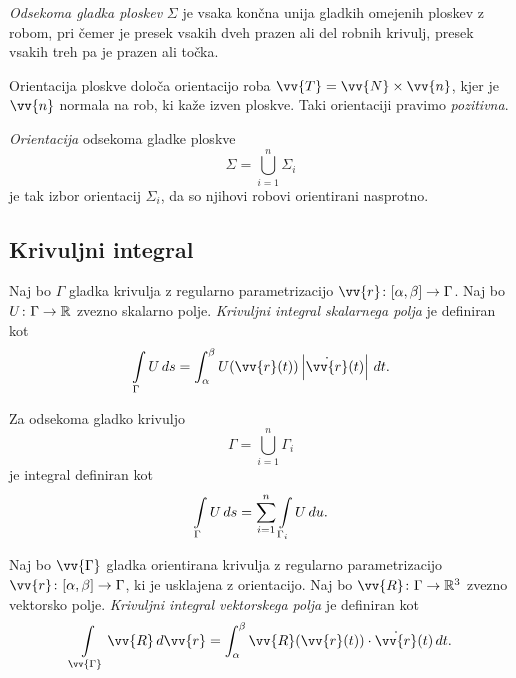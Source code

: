 \begin{definicija}
\emph{Odsekoma gladka ploskev}
$\Sigma$ je vsaka končna unija gladkih omejenih ploskev z robom,
pri čemer je presek vsakih dveh prazen ali del robnih krivulj,
presek vsakih treh pa je prazen ali točka.
\end{definicija}

\begin{opomba}
Orientacija ploskve določa orientacijo roba
$\vv{T} = \vv{N} \times \vv{n}$, kjer je $\vv{n}$ normala na rob,
ki kaže izven ploskve. Taki orientaciji pravimo \emph{pozitivna}.
\end{opomba}

\begin{definicija}
\emph{Orientacija} odsekoma gladke ploskve
\[
\Sigma = \bigcup_{i=1}^n \Sigma_i
\]
je tak izbor orientacij $\Sigma_i$, da so njihovi robovi
orientirani nasprotno.
\end{definicija}

\newpage

\subsection{Krivuljni integral}

\begin{definicija}
Naj bo $\Gamma$ gladka krivulja z regularno parametrizacijo
$\vv{r} \colon [\alpha, \beta] \to \Gamma$. Naj bo
$U \colon \Gamma \to \mathbb{R}$ zvezno skalarno polje.
\emph{Krivuljni integral skalarnega polja}
je definiran kot
\[
\lint_\Gamma U\,ds =
\int_\alpha^\beta U(\vv{r}(t)) \abs{\dot{\vv{r}}(t)}\,dt.
\]
\end{definicija}

\begin{opomba}
Za odsekoma gladko krivuljo
\[
\Gamma = \bigcup_{i=1}^n \Gamma_i
\]
je integral definiran kot
\[
\int\limits_\Gamma U\,ds =
\sum_{i=1}^n \int\limits_{\Gamma_i} U\,du.
\]
\end{opomba}

\begin{definicija}
Naj bo $\vv{\Gamma}$ gladka orientirana krivulja z regularno
parametrizacijo $\vv{r} \colon [\alpha, \beta] \to \Gamma$, ki je
usklajena z orientacijo. Naj bo $\vv{R} \colon \Gamma \to \R^3$
zvezno vektorsko polje. \emph{Krivuljni integral vektorskega polja}
je definiran kot
\[
\lint_{\vv{\Gamma}} \vv{R}\,d\vv{r} =
\int_\alpha^\beta \vv{R}(\vv{r}(t)) \cdot \dot{\vv{r}}(t)\,dt.
\]
\end{definicija}

